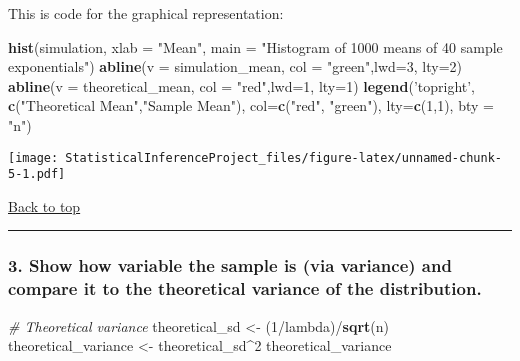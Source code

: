 \documentclass[]{article}
\newenvironment{Shaded}{\begin{snugshade}}{\end{snugshade}}
\newcommand{\KeywordTok}[1]{\textcolor[rgb]{0.13,0.29,0.53}{\textbf{{#1}}}}
\newcommand{\DataTypeTok}[1]{\textcolor[rgb]{0.13,0.29,0.53}{{#1}}}
\newcommand{\DecValTok}[1]{\textcolor[rgb]{0.00,0.00,0.81}{{#1}}}
\newcommand{\StringTok}[1]{\textcolor[rgb]{0.31,0.60,0.02}{{#1}}}
\newcommand{\CommentTok}[1]{\textcolor[rgb]{0.56,0.35,0.01}{\textit{{#1}}}}
\newcommand{\NormalTok}[1]{{#1}}
\begin{document}
This is code for the graphical representation:

\begin{Shaded}
\begin{Highlighting}[]
\KeywordTok{hist}\NormalTok{(simulation, }\DataTypeTok{xlab =} \StringTok{"Mean"}\NormalTok{, }\DataTypeTok{main =} \StringTok{"Histogram of 1000 means of 40 sample exponentials"}\NormalTok{)}
\KeywordTok{abline}\NormalTok{(}\DataTypeTok{v =} \NormalTok{simulation_mean, }\DataTypeTok{col =} \StringTok{"green"}\NormalTok{,}\DataTypeTok{lwd=}\DecValTok{3}\NormalTok{, }\DataTypeTok{lty=}\DecValTok{2}\NormalTok{)}
\KeywordTok{abline}\NormalTok{(}\DataTypeTok{v =} \NormalTok{theoretical_mean, }\DataTypeTok{col =} \StringTok{"red"}\NormalTok{,}\DataTypeTok{lwd=}\DecValTok{1}\NormalTok{, }\DataTypeTok{lty=}\DecValTok{1}\NormalTok{)}
\KeywordTok{legend}\NormalTok{(}\StringTok{'topright'}\NormalTok{, }\KeywordTok{c}\NormalTok{(}\StringTok{"Theoretical Mean"}\NormalTok{,}\StringTok{"Sample Mean"}\NormalTok{), }
       \DataTypeTok{col=}\KeywordTok{c}\NormalTok{(}\StringTok{"red"}\NormalTok{, }\StringTok{"green"}\NormalTok{), }\DataTypeTok{lty=}\KeywordTok{c}\NormalTok{(}\DecValTok{1}\NormalTok{,}\DecValTok{1}\NormalTok{), }\DataTypeTok{bty =} \StringTok{"n"}\NormalTok{)}
\end{Highlighting}
\end{Shaded}

\texttt{[image: StatisticalInferenceProject\_files/figure-latex/unnamed-chunk-5-1.pdf]}

\protect\hyperlink{top}{Back to top}

\begin{center}\rule{0.5\linewidth}{\linethickness}\end{center}

\subsubsection{3. Show how variable the sample is (via variance) and
compare it to the theoretical variance of the
distribution.}\label{show-how-variable-the-sample-is-via-variance-and-compare-it-to-the-theoretical-variance-of-the-distribution.}

\begin{Shaded}
\begin{Highlighting}[]
\CommentTok{# Theoretical variance}
\NormalTok{theoretical_sd <-}\StringTok{ }\NormalTok{(}\DecValTok{1}\NormalTok{/lambda)/}\KeywordTok{sqrt}\NormalTok{(n)}
\NormalTok{theoretical_variance <-}\StringTok{ }\NormalTok{theoretical_sd^}\DecValTok{2}
\NormalTok{theoretical_variance}
\end{Highlighting}
\end{Shaded}
\end{document}

